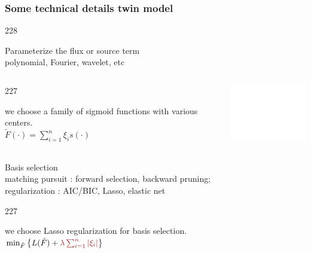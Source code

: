 \documentclass{beamer}
\let\oldcite=\cite
\renewcommand{\cite}[1]{\textcolor[rgb]{.4,.4,.85}{\oldcite{#1}}}
\newcommand{\barrow}{\item[\color{darkred}\ding{228}]}
\newcommand{\carrow}{\item[\color{darkred}\ding{227}]}
\begin{document}
\begin{frame}
    \frametitle{Some technical details \hfill \scriptsize{twin model}}\small
    \begin{dinglist}{228}
        \barrow Parameterize the flux or source term \\\vspace{.05cm} \scriptsize polynomial, Fourier, wavelet, etc\\
        \small
        \vspace{-.3cm}
        \begin{columns}
            \begin{dinglist}{227}
                \carrow we choose a family of sigmoid functions with various centers.\\\scriptsize
                        $
                            \tilde{F}(\cdot) = \sum_{i=1}^n \xi_i s(\cdot)
                        $
            \end{dinglist}
            \small
            \includegraphics[width=3.5cm]{sigmoid_empty.png}
        \end{columns}
        \barrow Basis selection\\\vspace{.05cm}
            \scriptsize matching pursuit \cite{Adler 96, Billing07}: forward selection, backward pruning;\\
            regularization \cite{Stone 77, Schwarz 78, Tibshirani 96}: AIC/BIC, Lasso, elastic net
            \small\vspace{.16cm}
            \begin{dinglist}{227}
                \carrow we choose Lasso regularization for basis selection.\scriptsize\\
                $
                    \min_{\tilde{F}} \left\{ L(\tilde{F})+\textcolor{darkred}{\lambda\sum_{i=1}^n\left| \xi_i \right|}\right\}
                $
            \end{dinglist}
    \end{dinglist}
\end{frame}
\end{document}
